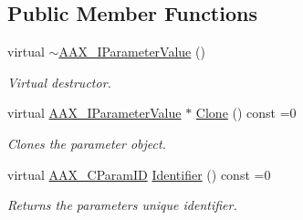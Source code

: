\subsection*{Public Member Functions}
\begin{DoxyCompactItemize}
\item 
virtual \hyperlink{a00109_a01435046395e84c47eef1e154b372823}{$\sim$\+A\+A\+X\+\_\+\+I\+Parameter\+Value} ()
\begin{DoxyCompactList}\small\item\em Virtual destructor. \end{DoxyCompactList}\item 
virtual \hyperlink{a00109}{A\+A\+X\+\_\+\+I\+Parameter\+Value} $\ast$ \hyperlink{a00109_a23ebf3322f5ded89954a5e220d2e717f}{Clone} () const =0
\begin{DoxyCompactList}\small\item\em Clones the parameter object. \end{DoxyCompactList}\item 
virtual \hyperlink{a00149_a1440c756fe5cb158b78193b2fc1780d1}{A\+A\+X\+\_\+\+C\+Param\+I\+D} \hyperlink{a00109_a5de1e79f1f0e7024f6f473d923b5dda2}{Identifier} () const =0
\begin{DoxyCompactList}\small\item\em Returns the parameter\textquotesingle{}s unique identifier. \end{DoxyCompactList}\end{DoxyCompactItemize}
